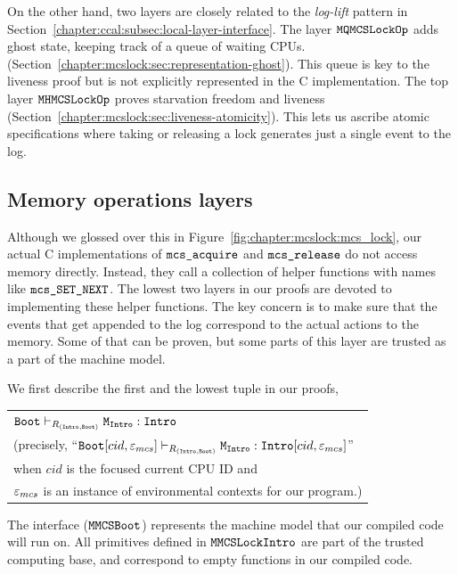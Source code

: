 On the other hand, two layers are closely related to the  \textit{log-lift} pattern in Section~\ref{chapter:ccal:subsec:local-layer-interface}.
The layer ${\mathrm{\texttt{MQMCSLockOp}}}$ adds ghost state, keeping track of a
queue of waiting CPUs.
(Section~\ref{chapter:mcslock:sec:representation-ghost}). This queue is key to the liveness proof but is not explicitly represented in the C implementation.
The top layer ${\mathrm{\texttt{MHMCSLockOp}}}$ proves starvation freedom and liveness
(Section~\ref{chapter:mcslock:sec:liveness-atomicity}). This lets us ascribe atomic
specifications where taking or releasing a lock generates just a
single event to the log.

\subsection{Memory operations layers}
\label{chapter:mcslock:subsec:lowestmachinemodel}

Although we glossed over this in Figure~\ref{fig:chapter:mcslock:mcs_lock}, our
actual C implementations of ${\mathrm{\texttt{mcs\_acquire}}}$ and
${\mathrm{\texttt{mcs\_release}}}$ do not access memory directly.  Instead, they call
a collection of helper functions with names like
${\mathrm{\texttt{mcs\_SET\_NEXT}}}$. The lowest two layers in our proofs
are devoted to implementing these helper functions.
The key concern is to make sure that the events that get appended to the log
correspond to the actual actions to the memory. Some of that can be proven, 
but some parts of this layer are trusted as a part of the machine model.

We first describe the first and the lowest tuple in our proofs,

\begin{center}
\begin{tabular}{P{0.95\textwidth}}
${\mathrm{\texttt{Boot}}} \vdash_{R_{({\mathrm{\texttt{Intro}}}, {\mathrm{\texttt{Boot}}})}} {\mathrm{\texttt{M}}}_{{\mathrm{\texttt{Intro}}}} : {\mathrm{\texttt{Intro}}}$\\
(precisely, ``${\mathrm{\texttt{Boot}}}[cid, {\varepsilon}_{mcs}] \vdash_{R_{({\mathrm{\texttt{Intro}}}, {\mathrm{\texttt{Boot}}})}} {\mathrm{\texttt{M}}}_{{\mathrm{\texttt{Intro}}}} : {\mathrm{\texttt{Intro}}}[cid, {\varepsilon}_{mcs}]$'' \\
when $cid$ is the focused current CPU ID and\\
 ${\varepsilon}_{mcs}$ is an instance of environmental contexts for our program.)\\
\end{tabular}
\end{center}

The interface (${\mathrm{\texttt{MMCSBoot}}}$) represents the machine model that our compiled code will run on.
All primitives defined in ${\mathrm{\texttt{MMCSLockIntro}}}$ are part of the trusted computing base, and correspond to empty functions in our compiled code.

